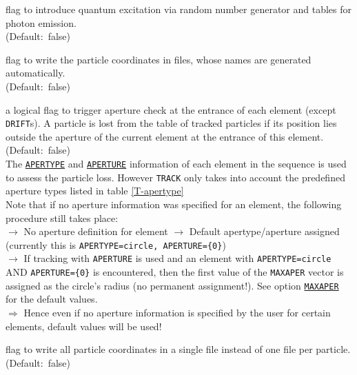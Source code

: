 \begin{madlist}
   flag to introduce quantum excitation via random
  number generator and tables for photon emission. \\ (Default:~false)

   flag to write the particle coordinates in files, whose
  names are generated automatically. \\ (Default:~false)

   a logical flag to trigger aperture check at the entrance 
  of each element (except {\tt DRIFT}s). A particle is lost from the table of 
  tracked particles if its position lies outside the aperture of the current 
  element at the entrance of this element. \\ 
  (Default:~false) \\
  
  The \hyperref[chap:aperture]{\tt APERTYPE} and 
  \hyperref[chap:aperture]{\tt APERTURE} information of each element 
  in the sequence is used to assess the particle loss. 
  However {\tt TRACK} only takes into account the predefined aperture 
  types listed in table \ref{T-apertype}
  \\
  
  Note that if no aperture information was specified for an element, 
  the following procedure still takes place:
  \\
  $\rightarrow$ No aperture definition for element $\rightarrow$ 
  Default apertype/aperture assigned (currently this is   
  {\tt APERTYPE=circle, APERTURE=\{0\}}) 
  \\ $\rightarrow$  
  If tracking with {\tt APERTURE} is used and an
  element with {\tt APERTYPE=circle} AND {\tt APERTURE=\{0\}}  
  is encountered, then the first value of the {\tt MAXAPER} vector
  is assigned as the circle's radius (no permanent assignment!). 
  See option \hyperref[sec:run]{\tt MAXAPER} for the default values. 
  \\ $\Rightarrow$
  Hence even if no aperture information is specified by the user for
  certain elements, default values will be used! 


   flag to write all particle coordinates in a single
  file instead of one file per particle. \\ (Default:~false)


\end{madlist}
